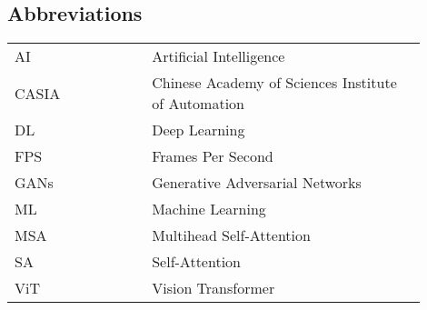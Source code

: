 \begin{center}
    \section*{Abbreviations}
    \begin{table}[h]
        \centering
        \renewcommand{\arraystretch}{1.5}
        \begin{tabular}{@{}p{0.3\linewidth}p{0.6\linewidth}@{}}
            AI    & Artificial Intelligence                             \\
            CASIA & Chinese Academy of Sciences Institute of Automation \\
            DL    & Deep Learning                                       \\
            FPS   & Frames Per Second                                   \\
            GANs  & Generative Adversarial Networks                     \\
            ML    & Machine Learning                                    \\
            MSA   & Multihead Self-Attention                            \\
            SA    & Self-Attention                                      \\
            ViT   & Vision Transformer                                  \\
        \end{tabular}
    \end{table}
\end{center}
